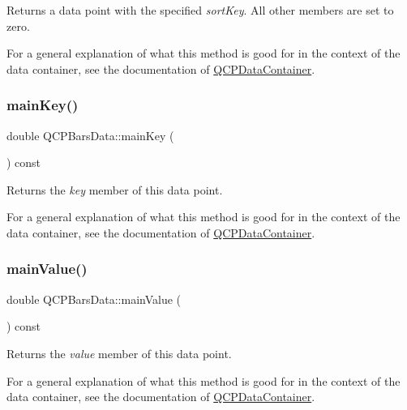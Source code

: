 Returns a data point with the specified {\itshape sort\+Key}. All other members are set to zero.

For a general explanation of what this method is good for in the context of the data container, see the documentation of \mbox{\hyperlink{class_q_c_p_data_container}{Q\+C\+P\+Data\+Container}}. \mbox{\label{class_q_c_p_bars_data_a8c1d09e63b0e90a6c1fba56ddeaa8964}} 
\subsubsection{\texorpdfstring{mainKey()}{mainKey()}}
{\footnotesize\ttfamily double Q\+C\+P\+Bars\+Data\+::main\+Key (\begin{DoxyParamCaption}{ }\end{DoxyParamCaption}) const\hspace{0.3cm}{\ttfamily [inline]}}

Returns the {\itshape key} member of this data point.

For a general explanation of what this method is good for in the context of the data container, see the documentation of \mbox{\hyperlink{class_q_c_p_data_container}{Q\+C\+P\+Data\+Container}}. \mbox{\label{class_q_c_p_bars_data_a360d975e587f9e84259aaec172efb10b}} 
\subsubsection{\texorpdfstring{mainValue()}{mainValue()}}
{\footnotesize\ttfamily double Q\+C\+P\+Bars\+Data\+::main\+Value (\begin{DoxyParamCaption}{ }\end{DoxyParamCaption}) const\hspace{0.3cm}{\ttfamily [inline]}}

Returns the {\itshape value} member of this data point.

For a general explanation of what this method is good for in the context of the data container, see the documentation of \mbox{\hyperlink{class_q_c_p_data_container}{Q\+C\+P\+Data\+Container}}. \mbox{\label{class_q_c_p_bars_data_a107d22d84f336bf6e3c3ad0133a5d2f6}} 
